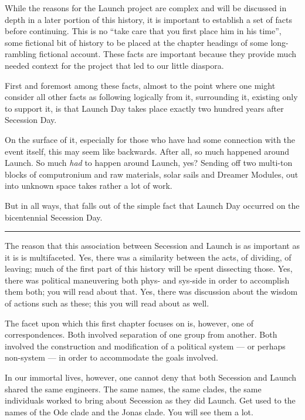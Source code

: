 While the reasons for the Launch project are complex and will be discussed in depth in a later portion of this history, it is important to establish a set of facts before continuing. This is no ``take care that you first place him in his time'', some fictional bit of history to be placed at the chapter headings of some long-rambling fictional account. These facts are important because they provide much needed context for the project that led to our little diaspora.

First and foremost among these facts, almost to the point where one might consider all other facts as following logically from it, surrounding it, existing only to support it, is that Launch Day takes place exactly two hundred years after Secession Day.

On the surface of it, especially for those who have had some connection with the event itself, this may seem like backwards. After all, so much happened around Launch. So much \emph{had} to happen around Launch, yes? Sending off two multi-ton blocks of computronium and raw materials, solar sails and Dreamer Modules, out into unknown space takes rather a lot of work.

But in all ways, that falls out of the simple fact that Launch Day occurred on the bicentennial Secession Day.

\begin{center}\rule{0.5\linewidth}{0.5pt}\end{center}

The reason that this association between Secession and Launch is as important as it is is multifaceted. Yes, there was a similarity between the acts, of dividing, of leaving; much of the first part of this history will be spent dissecting those. Yes, there was political maneuvering both phys- and sys-side in order to accomplish them both; you will read about that. Yes, there was discussion about the wisdom of actions such as these; this you will read about as well.

The facet upon which this first chapter focuses on is, however, one of correspondences. Both involved separation of one group from another. Both involved the construction and modification of a political system — or perhaps non-system — in order to accommodate the goals involved.

In our immortal lives, however, one cannot deny that both Secession and Launch shared the same engineers. The same names, the same clades, the same individuals worked to bring about Secession as they did Launch. Get used to the names of the Ode clade and the Jonas clade. You will see them a lot.

